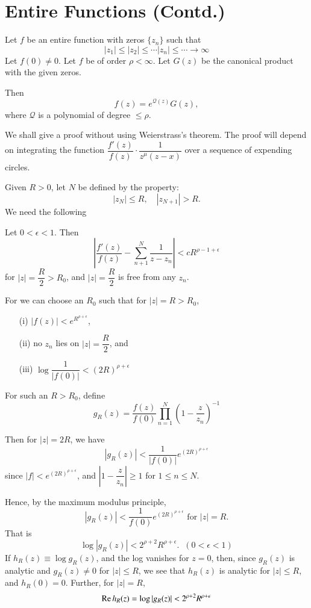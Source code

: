 \chapter{Entire Functions (Contd.)}\label{chap5}

\setcounter{thm}{0}
\begin{thm}[Hadamard]\label{chap5:thm1}
\cite{key8}\pageoriginale Let $f$ be an entire function with
zeros $\{z_{n}\}$ such that
$$
|z_1| \leq |z_2| \leq \cdots |z_{n}|\leq\cdots \to \infty 
$$
Let $f(0) \neq 0$. Let $f$ be of order $\rho < \infty$. Let $G(z)$ be
the canonical product with the given zeros.

Then
$$
f(z) = e^{\mathcal{Q}(z)} G(z),
$$
where $\mathcal{Q}$ is a polynomial of degree $\leq \rho$.

We shall give a proof without using Weierstrass's theorem. The proof
will depend on integrating the function
$\dfrac{f'(z)}{f(z)}\cdot \dfrac{1}{z^{\mu} (z-x)}$ over a sequence of
expending circles.

Given $R>0$, let $N$ be defined by the property:
$$
|z_N| \leq R, \quad |z_{N+1}| > R.
$$
We need the following 
\end{thm}

\begin{lemma*}
Let $0 < \epsilon < 1$. Then 
$$
\left|\frac{f'(z)}{f(z)} - \sum\limits^N_{n+1} \frac{1}{z-z_n}\right|
< c R^{\rho -1 + \epsilon}
$$
for $|z| = \dfrac{R}{2} > R_0$, and $|z| = \dfrac{R}{2}$ is free from
any $z_n$.
\end{lemma*}

For we can choose an $R_0$ such that for $|z| = R> R_0$,
\begin{itemize}
\item[(i)] $|f(z)| < e^{R^{\rho+\epsilon}}$,\pageoriginale

\item[(ii)] no $z_n$ lies on $|z| = \dfrac{R}{2}$, and 

\item[(iii)] $\log \dfrac{1}{|f(0)|} < (2R)^{\rho + \epsilon}$
\end{itemize}

For such an $R > R_0$, define 
$$
g_R (z) = \frac{f(z)}{f(0)} \prod\limits^N_{n=1} \left(1-\frac{z}{z_n}
\right)^{-1} 
$$

Then for $|z| = 2R$, we have
$$
|g_R(z)| < \frac{1}{|f(0)|} e^{(2R)^{\rho+\epsilon}}
$$
since $|f| < e^{(2R)^{\rho+\epsilon}}$, and $\left|1-\dfrac{z}{z_n}\right|
\geq 1$ for $1 \leq n \leq N$.

Hence, by the maximum modulus principle,
$$
|g_R(z)| < \frac{1}{f(0)} e^{(2R)^{\rho + \epsilon}} \text{ for }
|z| = R.
$$
That is
$$
\log |g_R (z)| < 2^{\rho +2} R^{\rho + \epsilon}.  \; \; (0 < \epsilon
< 1)
$$
If $h_R(z) \equiv \log g_R (z)$, and the log vanishes for $z=0$, then,
since $g_R(z)$ is analytic and $g_R (z) \neq 0$ for $|z| \leq R$, we
see that $h_R (z)$ is analytic for $|z| \leq R$, and $h_R
(0)=0$. Further, for $|z| =R$,
$$
\operatorname{Re} h_R (z) = \log |g_R (z)| < 2^{\rho +2} R^{\rho + \epsilon}
$$

